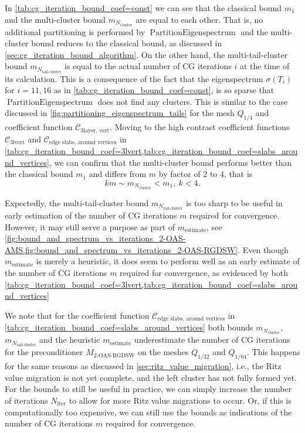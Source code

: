 In \cref{tab:cg_iteration_bound_coef=const} we can see that the classical bound $m_1$ and the multi-cluster bound $m_{N_{\text{cluster}}}$ are equal to each other. That is, no additional partitioning is performed by $\operatorname{PartitionEigenspectrum}$ and the multi-cluster bound reduces to the classical bound, as discussed in \cref{sec:cg_iteration_bound_algorithm}.
On the other hand, the multi-tail-cluster bound $m_{N_{\text{tail-cluster}}}$ is equal to the actual number of CG iterations $i$ at the time of its calculation. This is a consequence of the fact that the eigenspectrum $\sigma(T_{i})$ for $i=11,16$ as in \cref{tab:cg_iteration_bound_coef=const}, is so sparse that $\operatorname{PartitionEigenspectrum}$ does not find any clusters. This is similar to the case discussed in \cref{fig:partitioning_eigenspectrum_tails} for the mesh $Q_{1/4}$ and coefficient function $\mathcal{C}_{\text{3layer, vert}}$.
Moving to the high contrast coefficient functions $\mathcal{C}_{\text{3lvert}}$ and $\mathcal{C}_{\text{edge slabs, around vertices}}$ in \cref{tab:cg_iteration_bound_coef=3lvert,tab:cg_iteration_bound_coef=slabs_around_vertices}, we can confirm that the multi-cluster bound performs better than the classical bound $m_1$ and differs from $m$ by factor of 2 to 4, that is
\begin{equation}
    km \sim m_{N_{\text{cluster}}} < m_1, \ k < 4.
    \label{eq:multi_cluster_bound_factor}
\end{equation}

Expectedly, the multi-tail-cluster bound $m_{N_{\text{tail-cluster}}}$ is too sharp to be useful in early estimation of the number of CG iterations $m$ required for convergence. However, it may still serve a purpose as part of $m_{\text{estimate}}$, see \cref{fig:bound_and_spectrum_vs_iterations_2-OAS-AMS,fig:bound_and_spectrum_vs_iterations_2-OAS-RGDSW}. Even though $m_{\text{estimate}}$ is merely a heuristic, it does seem to perform well as an early estimate of the number of CG iterations $m$ required for convergence, as evidenced by both \cref{tab:cg_iteration_bound_coef=3lvert,tab:cg_iteration_bound_coef=slabs_around_vertices}

We note that for the coefficient function $\mathcal{C}_{\text{edge slabs, around vertices}}$ in \cref{tab:cg_iteration_bound_coef=slabs_around_vertices} both bounds $m_{N_{\text{cluster}}}$, $m_{N_{\text{tail-cluster}}}$ and the heuristic $m_{\text{estimate}}$ underestimate the number of CG iterations for the preconditioner $M_{\text{2-OAS-RGDSW}}$ on the meshes $Q_{1/32}$ and $Q_{1/64}$. This happens for the same reasons as discussed in \cref{sec:ritz_value_migration}, i.e., the Ritz value migration is not yet complete, and the left cluster has not fully formed yet. For the bounds to still be useful in practice, we can simply increase the number of iterations $N_{\text{iter}}$ to allow for more Ritz value migrations to occur. Or, if this is computationally too expensive, we can still use the bounds as indications of the number of CG iterations $m$ required for convergence.

